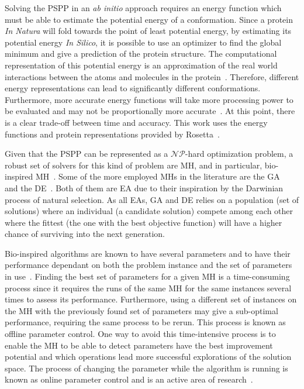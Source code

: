 Solving the \ac{PSPP} in an \textit{ab initio} approach requires an energy function
which must be able to estimate the potential energy of a conformation. Since a
protein \textit{In Natura} will fold towards the point of least potential
energy, by estimating its potential energy \textit{In Silico}, it is possible to
use an optimizer to find the global minimum and give a prediction of the
protein structure. The computational representation of this potential energy is
an approximation of the real world interactions between the atoms and molecules
in the protein~\cite{alford2017rosetta}. Therefore,
different energy representations can lead to
significantly different conformations. Furthermore, more accurate energy
functions will take more processing power to be evaluated and may not be
proportionally more accurate~\cite{xu2012ab}. At this point,
there is a clear trade-off between time and accuracy.
This work uses the energy functions and protein representations provided by
Rosetta~\cite{rohl2004protein,leaver2011rosetta3}.

Given that the \ac{PSPP} can be represented as a $\mathcal{NP}$-hard optimization
problem, a robust set of solvers for this kind of problem are
\ac{MH}, and in particular, bio-inspired \ac{MH}~\cite{kar2016bio}.
Some of the more employed \ac{MH}s in the literature are the
\ac{GA}~\cite{holland1992genetic} and the
\ac{DE}~\cite{storn1997differential}. Both of them are
\ac{EA} due to their inspiration by the Darwinian process of natural
selection. As all \ac{EA}s, \ac{GA} and \ac{DE} relies on a population
(set of solutions) where an
individual (a candidate solution) compete among each other where the fittest (the one
with the best objective function) will have a higher chance of surviving into
the next generation.

Bio-inspired algorithms are known to have several parameters and to have their
performance dependant on both the problem instance and the set of parameters in
use~\cite{eiben2007parameter}.
Finding the best set of parameters for a given \ac{MH} is a time-consuming
process since it requires the runs of the same \ac{MH} for the same instances
several times to assess its performance. Furthermore, using a different set of
instances on the \ac{MH} with the previously found set of parameters may give a
sub-optimal performance, requiring the same process to be rerun.  This process
is known as offline parameter control. One way to avoid this time-intensive
process is to enable the \ac{MH} to be able to detect parameters have the best
improvement potential and which operations lead more successful explorations of
the solution space. The process of changing the parameter while the algorithm
is running is known as online parameter control and is an active area of
research~\cite{parpinelli18review}.

